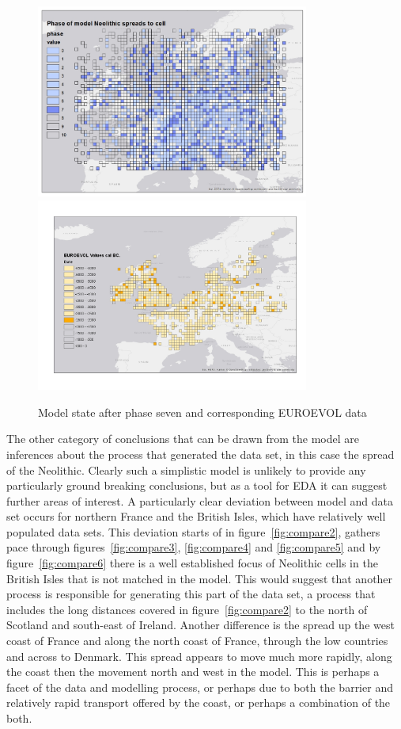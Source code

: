 \begin{figure}
\centering
	\includegraphics[width=0.8\textwidth]{figures/model-7}
	\includegraphics[width=0.8\textwidth]{figures/euroevol-7}
  \caption{Model state after phase seven and corresponding EUROEVOL data}
  \label{fig:compare7}
\end{figure}

The other category of conclusions that can be drawn from the model are inferences about the process that generated the data set, in this case the spread of the Neolithic. Clearly such a simplistic model is unlikely to provide any particularly ground breaking conclusions, but as a tool for EDA it can suggest further areas of interest. A particularly clear deviation between model and data set occurs for northern France and the British Isles, which have relatively well populated data sets. This deviation starts of in figure~\ref{fig:compare2}, gathers pace through figures~\ref{fig:compare3}, \ref{fig:compare4} and \ref{fig:compare5} and by figure~\ref{fig:compare6} there is a well established focus of Neolithic cells in the British Isles that is not matched in the model. This would suggest that another process is responsible for generating this part of the data set, a process that includes the long distances covered in figure~\ref{fig:compare2} to the north of Scotland and south-east of Ireland. Another difference is the spread up the west coast of France and along the north coast of France, through the low countries and across to Denmark. This spread appears to move much more rapidly, along the coast then the movement north and west in the model. This is perhaps a facet of the data and modelling process, or perhaps due to both the barrier and relatively rapid transport offered by the coast, or perhaps a combination of the both. 

